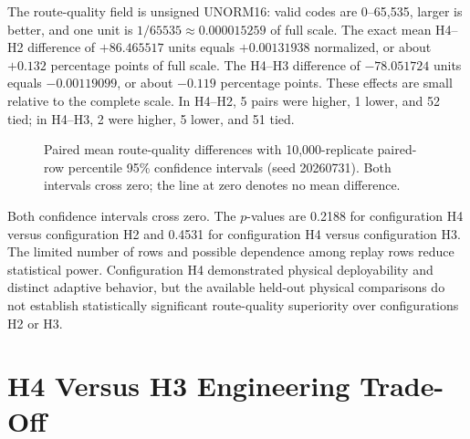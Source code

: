 The route-quality field is unsigned UNORM16: valid codes are 0--65,535, larger is
better, and one unit is $1/65535\approx0.000015259$ of full scale. The exact mean
H4--H2 difference of $+86.465517$ units equals $+0.00131938$ normalized, or about
$+0.132$ percentage points of full scale. The H4--H3 difference of $-78.051724$
units equals $-0.00119099$, or about $-0.119$ percentage points. These effects are
small relative to the complete scale. In H4--H2, 5 pairs were higher, 1 lower, and
52 tied; in H4--H3, 2 were higher, 5 lower, and 51 tied.

\begin{figure}[H]
\centering
{}
\caption{Paired mean route-quality differences with 10,000-replicate paired-row
percentile 95\% confidence intervals (seed 20260731). Both intervals cross zero;
the line at zero denotes no mean difference.}
\label{fig:paired-quality-ci}
\end{figure}

Both confidence intervals cross zero. The $p$-values are 0.2188 for configuration
H4 versus configuration H2 and 0.4531 for configuration H4 versus configuration H3.
The limited number of rows and possible dependence among replay rows reduce
statistical power. Configuration H4 demonstrated physical deployability and
distinct adaptive behavior, but the available held-out physical comparisons do not
establish statistically significant route-quality superiority over configurations
H2 or H3.

\section{H4 Versus H3 Engineering Trade-Off}

